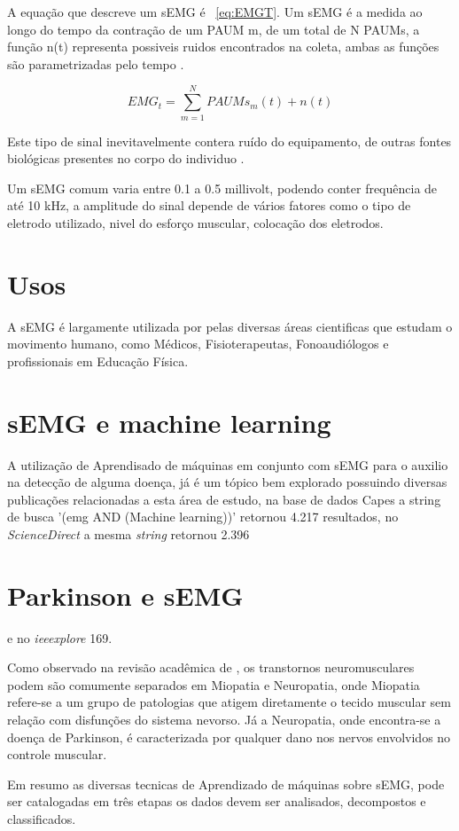 A equação que descreve um sEMG é ~\ref{eq:EMGT}. Um sEMG é a medida ao longo do tempo da contração de um PAUM m, de um total de N PAUMs, a função n(t) representa possiveis ruidos encontrados na coleta, ambas as funções são parametrizadas pelo tempo \cite{yousefi2014characterizing}.

\begin{equation} \label{eq:EMGT}
    EMG_{t} =\sum_{m=1}^{N} PAUMs_{m}(t)+n(t)
\end{equation}

Este tipo de sinal inevitavelmente contera ruído do equipamento, de outras fontes biológicas presentes no corpo do individuo \cite{yousefi2014characterizing}.






Um sEMG comum varia entre 0.1 a 0.5 millivolt, podendo conter frequência de até 10 kHz, a amplitude do sinal depende de vários fatores como o tipo de eletrodo utilizado, nivel do esforço muscular, colocação dos eletrodos.

\section{Usos}
A sEMG é largamente utilizada por pelas diversas áreas cientificas que estudam o movimento humano, como Médicos, Fisioterapeutas, Fonoaudiólogos e profissionais em Educação Física\cite{nascimento2012surface}.

\section{sEMG e machine learning}
A utilização de Aprendisado de máquinas em conjunto com sEMG para o auxilio na detecção de alguma doença, já é um tópico bem explorado possuindo diversas publicações relacionadas a esta área de estudo, na base de dados Capes a string de busca '(emg AND (Machine learning))' retornou 4.217 resultados, no \textit{ScienceDirect} a mesma \textit{string} retornou 2.396 \section{Parkinson e sEMG} e no \textit{ieeexplore} 169.

Como observado na revisão acadêmica de \cite{yousefi2014characterizing}, os transtornos neuromusculares podem são comumente separados em Miopatia e Neuropatia, onde Miopatia refere-se a um grupo de patologias que atigem diretamente o tecido muscular sem relação com disfunções do sistema nevorso. Já a Neuropatia, onde encontra-se a doença de Parkinson, é caracterizada por qualquer dano nos nervos envolvidos no controle muscular.

Em resumo as diversas tecnicas de Aprendizado de máquinas sobre sEMG, pode ser catalogadas em três etapas os dados devem ser analisados, decompostos e classificados\cite{yousefi2014characterizing}.

